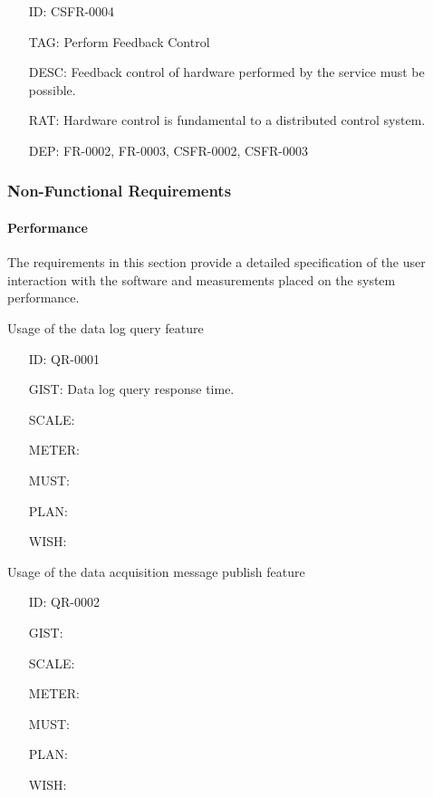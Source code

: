         \begin{itemize}
          \setlength{\itemindent}{.5in}
          \itemsep .15em
          \item[ID:] CSFR-0004
          \item[TAG:] Perform Feedback Control
          \item[DESC:] Feedback control of hardware performed by the service
            must be possible.
          \item[RAT:] Hardware control is fundamental to a distributed
            control system.
          \item[DEP:] FR-0002, FR-0003, CSFR-0002, CSFR-0003
        \end{itemize}

    \subsubsection{Non-Functional Requirements}\label{sec:req-srs-func}

      \paragraph{Performance}

        The requirements in this section provide a detailed specification of
        the user interaction with the software and measurements placed on the
        system performance.

        Usage of the data log query feature

        \begin{itemize}
          \setlength{\itemindent}{.5in}
          \itemsep .15em
          \item[ID:] QR-0001
          \item[GIST:] Data log query response time.
          \item[SCALE:]
          \item[METER:]
          \item[MUST:]
          \item[PLAN:]
          \item[WISH:]
        \end{itemize}

        Usage of the data acquisition message publish feature

        \begin{itemize}
          \setlength{\itemindent}{.5in}
          \itemsep .15em
          \item[ID:] QR-0002
          \item[GIST:]
          \item[SCALE:]
          \item[METER:]
          \item[MUST:]
          \item[PLAN:]
          \item[WISH:]
        \end{itemize}


